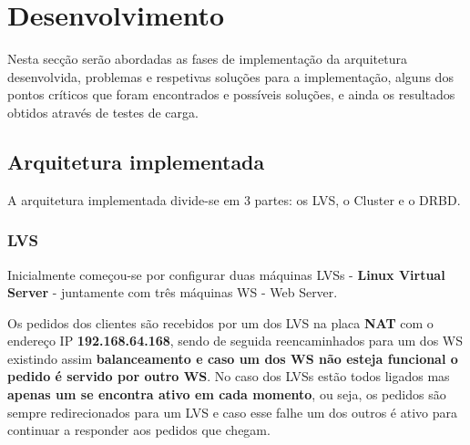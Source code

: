 \chapter{Desenvolvimento} \label{chap:desen}

\hspace{5mm} Nesta secção serão abordadas as fases de implementação da arquitetura desenvolvida, problemas e respetivas soluções para a implementação, alguns dos pontos críticos que foram encontrados e possíveis soluções, e ainda os resultados obtidos através de testes de carga.

\section{Arquitetura implementada} \label{sec:arqimp}

\hspace{5mm} A arquitetura implementada divide-se em 3 partes: os
LVS, o Cluster e o DRBD.

\subsection{LVS} \label{subsec:lvs}

\hspace{5mm} Inicialmente começou-se por configurar duas máquinas LVSs - \textbf{Linux Virtual Server} - juntamente com três máquinas WS - Web Server.

\hspace{5mm} Os pedidos dos clientes são recebidos por um dos LVS na placa \textbf{NAT} com o endereço IP \textbf{192.168.64.168}, sendo de seguida reencaminhados para um dos WS existindo assim \textbf{balanceamento e caso um dos WS não esteja funcional o pedido é servido por outro WS}. No caso dos LVSs estão todos ligados mas \textbf{apenas um se encontra ativo em cada momento}, ou seja, os pedidos são sempre redirecionados para um LVS e caso esse falhe um dos outros é ativo para continuar a responder aos pedidos que chegam.

